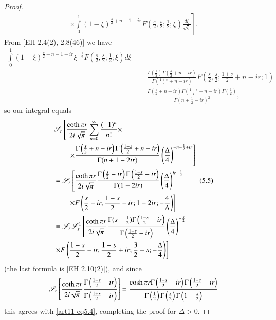 \begin{proof}
\begin{multline*}
\left.  \times \int\limits^1_0 (1-\xi)^{\frac{s}{2} + n -1 - ir} F\left(\frac{s}{2}, \frac{s}{2}; \frac{1}{2}; \xi \right) \frac{d\xi}{\sqrt{\xi}} \right].
\end{multline*}
From [EH 2.4(2), 2.8(46)] we have 
\begin{align*}
\int\limits^1_0 (1-\xi)^{\frac{s}{2} + n - 1 - ir} \xi^{-\frac{1}{2}} F\left(\frac{s}{2}, \frac{s}{2} ; \frac{1}{2}; \xi  \right) d \xi\\
& = \frac{\Gamma \left(\frac{1}{2} \right)  \Gamma \left(\frac{s}{2}+ n - ir \right)}{
\Gamma \left(\frac{1+s}{2} + n - ir \right)} F \left(\frac{s}{2} , \frac{s}{2}; \frac{1+s}{2} + n -ir; 1 \right) \\
& = \frac{\Gamma \left(\frac{s}{2} + n - ir \right) \Gamma \left(\frac{1-s}{2} + n - ir \right) \Gamma \left(\frac{1}{2} \right)}{\Gamma \left(n+ \frac{1}{2} -ir \right)^2},
\end{align*}
so our integral equals 
\begin{align*}
& \mathscr{S}_r \left[ \frac{\coth \pi r}{2 i \sqrt{\pi}} \sum\limits^\infty_{n=0} \frac{(-1)^n}{n!}  \times  \right.\\
& \qquad \left.\times \frac{\Gamma \left(\frac{s}{2} + n - ir \right)\Gamma \left(\frac{1-s}{2} + n - ir \right)}{\Gamma (n+ 1 - 2 ir)} \left(\frac{\Delta}{4} \right)^{-n -\frac{1}{2} + ir} \right]\\
& = \mathscr{S}_r \left[ \frac{\coth \pi r }{2i \sqrt{\pi}} \frac{\Gamma \left(\frac{s}{2} - ir \right) \Gamma \left(\frac{1-s}{2} - ir \right)}{\Gamma (1 - 2 ir)} \left(\frac{\Delta}{4} \right)^{ir - \frac{1}{2}}\right. \tag{5.5}\label{art11-eq5.5}\\
&\quad \quad \left.  \times F \left(\frac{s}{2} - ir , \frac{1-s}{2} - ir; 1 - 2 ir ; -\frac{4}{\Delta} \right)\right]\\
& = \mathscr{S}_r \mathscr{S}^1_s \left[\frac{\coth \pi r}{ 2 i \sqrt{\pi}} \frac{\Gamma (s - \frac{1}{2}) \Gamma \left(\frac{1-s}{2} -ir \right) }{\Gamma \left(\frac{1+s}{2} - ir \right)} \left(\frac{\Delta}{4} \right)^{-\frac{s}{2}} \right. \\ 
& \left. \times F \left(\frac{1-s}{2} - ir, \frac{1-s}{2} + ir; \frac{3}{2} - s ; -\frac{\Delta}{4} \right)\right]
\end{align*}
(the last formula is [EH 2.10(2)]), and since 
$$
\mathscr{S}_r \left[\frac{\coth \pi r}{2 i \sqrt{\pi}} \frac{\Gamma \left(\frac{1-s}{2} -ir \right)}{\Gamma \left(\frac{1+s}{2} -ir\right)} \right] = \frac{\cosh \pi r \Gamma \left(\frac{1-s}{2} + ir \right) \Gamma \left(\frac{1-s}{2} -ir \right)}{ \Gamma \left(\frac{1}{2} \right) \Gamma \left(\frac{s}{2} \right) \Gamma \left(1-\frac{s}{2} \right)}
$$
this agrees with \eqref{art11-eq5.4}, completing the proof for $\Delta > 0$.


\end{proof}
